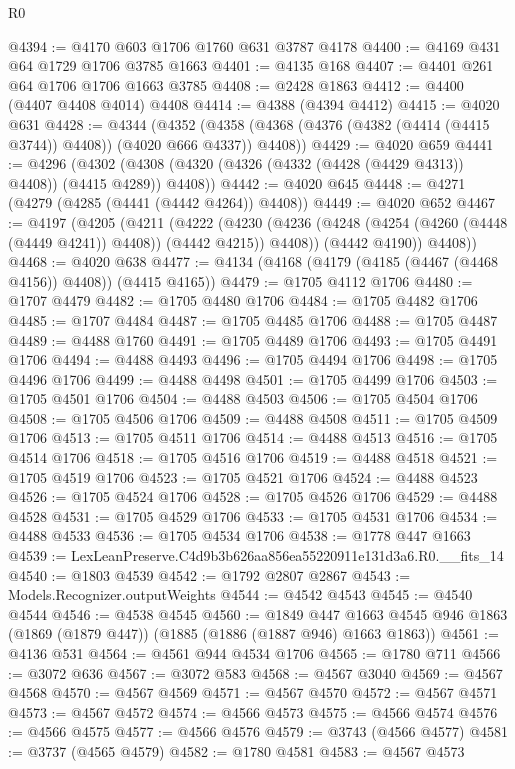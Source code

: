 \begin{lexlean}{R0}
\begin{coremodule}
@4394 := @4170 @603 @1706 @1760 @631 @3787 @4178
@4400 := @4169 @431 @64 @1729 @1706 @3785 @1663
@4401 := @4135 @168
@4407 := @4401 @261 @64 @1706 @1706 @1663 @3785
@4408 := @2428 @1863
@4412 := @4400 (@4407 @4408 @4014) @4408
@4414 := @4388 (@4394 @4412)
@4415 := @4020 @631
@4428 := @4344
    (@4352 (@4358 (@4368 (@4376 (@4382 (@4414 (@4415 @3744)) @4408)) (@4020 @666 @4337)) @4408))
@4429 := @4020 @659
@4441 := @4296
    (@4302 (@4308 (@4320 (@4326 (@4332 (@4428 (@4429 @4313)) @4408)) (@4415 @4289)) @4408))
@4442 := @4020 @645
@4448 := @4271 (@4279 (@4285 (@4441 (@4442 @4264)) @4408))
@4449 := @4020 @652
@4467 := @4197
    (@4205
      (@4211
        (@4222
          (@4230 (@4236 (@4248 (@4254 (@4260 (@4448 (@4449 @4241)) @4408)) (@4442 @4215)) @4408))
          (@4442 @4190))
        @4408))
@4468 := @4020 @638
@4477 := @4134 (@4168 (@4179 (@4185 (@4467 (@4468 @4156)) @4408)) (@4415 @4165))
@4479 := @1705 @4112 @1706
@4480 := @1707 @4479
@4482 := @1705 @4480 @1706
@4484 := @1705 @4482 @1706
@4485 := @1707 @4484
@4487 := @1705 @4485 @1706
@4488 := @1705 @4487
@4489 := @4488 @1760
@4491 := @1705 @4489 @1706
@4493 := @1705 @4491 @1706
@4494 := @4488 @4493
@4496 := @1705 @4494 @1706
@4498 := @1705 @4496 @1706
@4499 := @4488 @4498
@4501 := @1705 @4499 @1706
@4503 := @1705 @4501 @1706
@4504 := @4488 @4503
@4506 := @1705 @4504 @1706
@4508 := @1705 @4506 @1706
@4509 := @4488 @4508
@4511 := @1705 @4509 @1706
@4513 := @1705 @4511 @1706
@4514 := @4488 @4513
@4516 := @1705 @4514 @1706
@4518 := @1705 @4516 @1706
@4519 := @4488 @4518
@4521 := @1705 @4519 @1706
@4523 := @1705 @4521 @1706
@4524 := @4488 @4523
@4526 := @1705 @4524 @1706
@4528 := @1705 @4526 @1706
@4529 := @4488 @4528
@4531 := @1705 @4529 @1706
@4533 := @1705 @4531 @1706
@4534 := @4488 @4533
@4536 := @1705 @4534 @1706
@4538 := @1778 @447 @1663
@4539 := LexLeanPreserve.C4d9b3b626aa856ea55220911e131d3a6.R0.__fits_14
@4540 := @1803 @4539
@4542 := @1792 @2807 @2867
@4543 := Models.Recognizer.outputWeights
@4544 := @4542 @4543
@4545 := @4540 @4544
@4546 := @4538 @4545
@4560 := @1849
    @447
    @1663
    @4545
    @946
    @1863
    (@1869 (@1879 @447))
    (@1885 (@1886 (@1887 @946) @1663 @1863))
@4561 := @4136 @531
@4564 := @4561 @944 @4534 @1706
@4565 := @1780 @711
@4566 := @3072 @636
@4567 := @3072 @583
@4568 := @4567 @3040
@4569 := @4567 @4568
@4570 := @4567 @4569
@4571 := @4567 @4570
@4572 := @4567 @4571
@4573 := @4567 @4572
@4574 := @4566 @4573
@4575 := @4566 @4574
@4576 := @4566 @4575
@4577 := @4566 @4576
@4579 := @3743 (@4566 @4577)
@4581 := @3737 (@4565 @4579)
@4582 := @1780 @4581
@4583 := @4567 @4573

\end{coremodule}
\end{lexlean}
